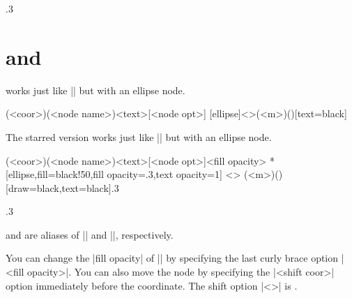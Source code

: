 \begin{tzcode}{.3}
\end{tzcode}



\section{\protect\cmd{\tznodeellipse} and \protect\cmd{\tznodeellipse*}}
\label{s:tznodeellipse}

\icmd{\tznodeellipse} works just like |\tznodeframe| but with an ellipse node.

\begin{tzdef}{}
(<coor>)(<node name>){<text>}[<node opt>]
  [ellipse]<>(<m>)(){}[text=black]
\end{tzdef}

The starred version \icmd{\tznodeellipse*} works just like |\tznodeframe*| but with an ellipse node.

\begin{tzdef}{}
               (<coor>)(<node name>){<text>}[<node opt>]{<fill opacity>}
 *[ellipse,fill=black!50,fill opacity=.3,text opacity=1] <>
  (<m>)(){}[draw=black,text=black]{.3}
\end{tzdef}


\begin{tzcode}{.3}
{}
\end{tzcode}

\icmd{\tznodeoval} and \icmd{\tznodeoval*} are aliases of |\tznodeellipse| and |\tznodeellipse*|, respectively.

You can change the |fill opacity| of |\tznodeellipse*| by specifying the last curly brace option |{<fill opacity>}|. You can also move the node by specifying the |<shift coor>| option immediately before the coordinate.
The  shift option |<>| is .

